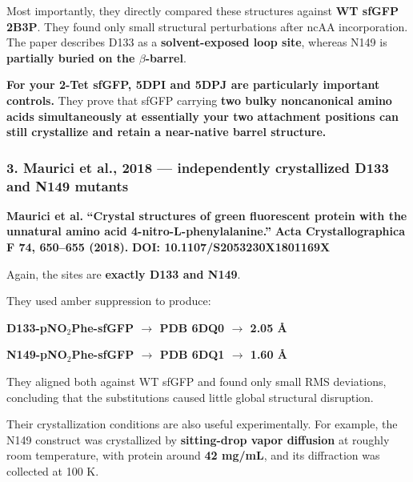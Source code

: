 \documentclass{article}
\begin{document}
Most importantly, they directly compared these structures against \textbf{WT sfGFP 2B3P}. They found only small structural perturbations after ncAA incorporation. The paper describes D133 as a \textbf{solvent-exposed loop site}, whereas N149 is \textbf{partially buried on the \(\beta\)-barrel}. \href{https://pmc.ncbi.nlm.nih.gov/articles/PMC4756619/}{\textbullet}

\href{https://pmc.ncbi.nlm.nih.gov/articles/PMC4756619/}{\textbullet}
\href{https://www.rcsb.org/structure/5DPI}{\textbullet}
\href{https://www.rcsb.org/structure/5DPJ}{\textbullet}

\textbf{For your 2-Tet sfGFP, 5DPI and 5DPJ are particularly important controls.} They prove that sfGFP carrying \textbf{two bulky noncanonical amino acids simultaneously at essentially your two attachment positions can still crystallize and retain a near-native barrel structure.}

\subsubsection*{3. Maurici et al., 2018 --- independently crystallized D133 and N149 mutants}

\textbf{Maurici et al.}
\textbf{``Crystal structures of green fluorescent protein with the unnatural amino acid 4-nitro-L-phenylalanine.''}
\textbf{Acta Crystallographica F 74, 650--655 (2018).}
\textbf{DOI: 10.1107/S2053230X1801169X}

Again, the sites are \textbf{exactly D133 and N149}.

They used amber suppression to produce:

\textbf{D133-pNO\(_2\)Phe-sfGFP \(\rightarrow\) PDB 6DQ0 \(\rightarrow\) 2.05 \AA}

\textbf{N149-pNO\(_2\)Phe-sfGFP \(\rightarrow\) PDB 6DQ1 \(\rightarrow\) 1.60 \AA}

They aligned both against WT sfGFP and found only small RMS deviations, concluding that the substitutions caused little global structural disruption. \href{https://pubmed.ncbi.nlm.nih.gov/30279317/}{\textbullet}

\href{https://pmc.ncbi.nlm.nih.gov/articles/PMC6168768/}{\textbullet}
\href{https://www.rcsb.org/structure/6DQ0}{\textbullet}
\href{https://www.rcsb.org/structure/6DQ1}{\textbullet}

Their crystallization conditions are also useful experimentally. For example, the N149 construct was crystallized by \textbf{sitting-drop vapor diffusion} at roughly room temperature, with protein around \textbf{42 mg/mL}, and its diffraction was collected at 100 K. \href{https://pmc.ncbi.nlm.nih.gov/articles/PMC6168768/}{\textbullet}
\end{document}
